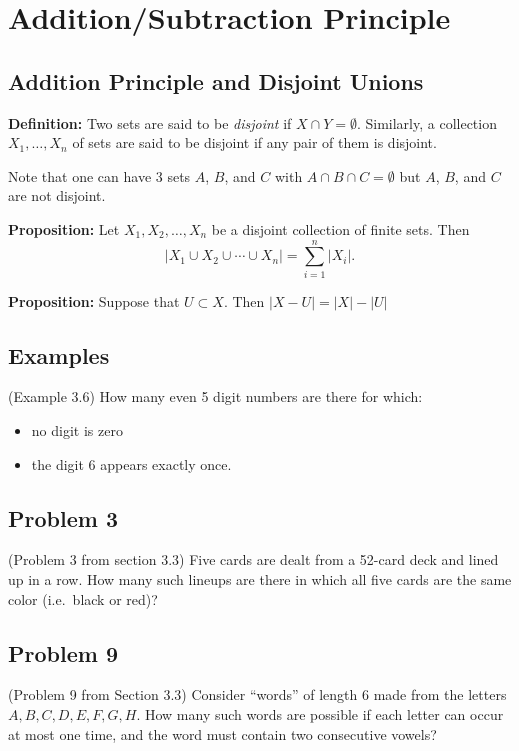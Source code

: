 \documentclass[
]{article}
\author{}
\date{}
\providecommand{\tightlist}{%
  \setlength{\itemsep}{0pt}\setlength{\parskip}{0pt}}
\begin{document}
\hypertarget{additionsubtraction-principle}{%
\section{Addition/Subtraction
Principle}\label{additionsubtraction-principle}}

\hypertarget{addition-principle-and-disjoint-unions}{%
\subsection{Addition Principle and Disjoint
Unions}\label{addition-principle-and-disjoint-unions}}

\textbf{Definition:} Two sets are said to be \emph{disjoint} if
\(X\cap Y=\emptyset\). Similarly, a collection \(X_1,\ldots, X_n\) of
sets are said to be disjoint if any pair of them is disjoint.

Note that one can have 3 sets \(A\), \(B\), and \(C\) with
\(A\cap B\cap C=\emptyset\) but \(A\), \(B\), and \(C\) are not
disjoint.

\textbf{Proposition:} Let \(X_1,X_2,\ldots, X_n\) be a disjoint
collection of finite sets. Then \[
|X_1\cup X_2\cup\cdots\cup X_n|=\sum_{i=1}^{n} |X_{i}|.
\] \vfill

\textbf{Proposition:} Suppose that \(U\subset X\). Then
\(|X-U|=|X|-|U|\)

\vfill\eject

\hypertarget{examples}{%
\subsection{Examples}\label{examples}}

(Example 3.6) How many even 5 digit numbers are there for which:

\begin{itemize}
\tightlist
\item
  no digit is zero
\item
  the digit \(6\) appears exactly once.
\end{itemize}

\vfill\eject

\hypertarget{problem-3}{%
\subsection{Problem 3}\label{problem-3}}

(Problem 3 from section 3.3) Five cards are dealt from a 52-card deck
and lined up in a row. How many such lineups are there in which all five
cards are the same color (i.e.~black or red)?

\vfill\eject

\hypertarget{problem-9}{%
\subsection{Problem 9}\label{problem-9}}

(Problem 9 from Section 3.3) Consider ``words'' of length 6 made from
the letters \(A,B,C,D,E,F,G,H\). How many such words are possible if
each letter can occur at most one time, and the word must contain two
consecutive vowels?
\end{document}
